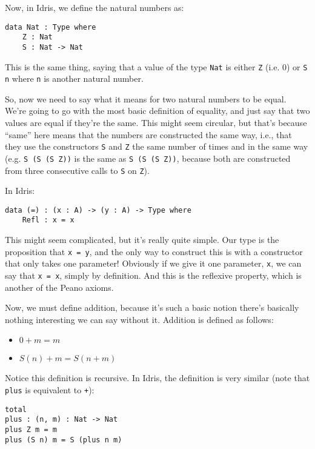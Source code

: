 \documentclass{article}
\newcommand{\inline}[1]{\texttt{#1}}
\begin{document}
Now, in Idris, we define the natural numbers as:
\begin{verbatim}
data Nat : Type where
    Z : Nat
    S : Nat -> Nat
\end{verbatim}

This is the same thing, saying that a value of the type \inline{Nat} is either \inline{Z} (i.e. 0) or \inline{S n} where \inline{n} is another natural number.

So, now we need to say what it means for two natural numbers to be equal.
We're going to go with the most basic definition of equality, and just say that two values are equal if they're the same.
This might seem circular, but that's because ``same'' here means that the numbers are constructed the same way, i.e., that they use the constructors \inline{S} and \inline{Z} the same number of times and in the same way (e.g. \inline{S (S (S Z))} is the same as \inline{S (S (S Z))}, because both are constructed from three consecutive calls to \inline{S} on \inline{Z}).

In Idris:
\begin{verbatim}
data (=) : (x : A) -> (y : A) -> Type where
    Refl : x = x
\end{verbatim}

This might seem complicated, but it's really quite simple.
Our type is the proposition that \inline{x = y}, and the only way to construct this is with a constructor that only takes one parameter!
Obviously if we give it one parameter, \inline{x}, we can say that \inline{x = x}, simply by definition.
And this is the reflexive property, which is another of the Peano axioms.

Now, we must define addition, because it's such a basic notion there's basically nothing interesting we can say without it.
Addition is defined as follows:

\begin{itemize}
    \item[] $0 + m = m$
    \item[] $S(n) + m = S(n + m)$
\end{itemize}

Notice this definition is recursive.
In Idris, the definition is very similar (note that \inline{plus} is equivalent to \inline{+}):

\begin{verbatim}
total
plus : (n, m) : Nat -> Nat
plus Z m = m
plus (S n) m = S (plus n m)
\end{verbatim}
\end{document}
